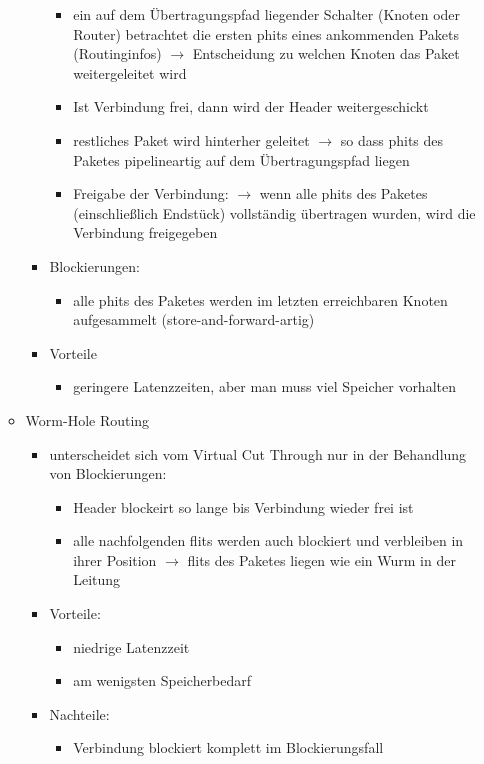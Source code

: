 \begin{itemize}
\begin{itemize}
\begin{itemize}
\begin{itemize}
				\item ein auf dem Übertragungspfad liegender Schalter (Knoten oder Router) betrachtet die ersten phits eines ankommenden Pakets (Routinginfos) $\to$ Entscheidung zu welchen Knoten das Paket weitergeleitet wird
				\item Ist Verbindung frei, dann wird der Header weitergeschickt
				\item restliches Paket wird hinterher geleitet $\to$ so dass phits des Paketes pipelineartig auf dem Übertragungspfad liegen
				\item Freigabe der Verbindung: $\to$ wenn alle phits des Paketes (einschließlich Endstück) vollständig übertragen wurden, wird die Verbindung freigegeben
			\end{itemize}
			\item Blockierungen:
			\begin{itemize}
				\item alle phits des Paketes werden im letzten erreichbaren Knoten aufgesammelt (store-and-forward-artig)
			\end{itemize}
			\item Vorteile
			\begin{itemize}
				\item geringere Latenzzeiten, aber man muss viel Speicher vorhalten
			\end{itemize}
		\end{itemize}
		\item Worm-Hole Routing
		\begin{itemize}
			\item unterscheidet sich vom Virtual Cut Through nur in der Behandlung von Blockierungen:
			\begin{itemize}
				\item Header blockeirt so lange bis Verbindung wieder frei ist
				\item alle nachfolgenden flits werden auch blockiert und verbleiben in ihrer Position $\to$ flits des Paketes liegen wie ein Wurm in der Leitung 
			\end{itemize}
			\item Vorteile:
			\begin{itemize}
				\item niedrige Latenzzeit
				\item am wenigsten Speicherbedarf
			\end{itemize}
			\item Nachteile:
			\begin{itemize}
				\item Verbindung blockiert komplett im Blockierungsfall
			\end{itemize}
		\end{itemize}
	\end{itemize}
\end{itemize}
